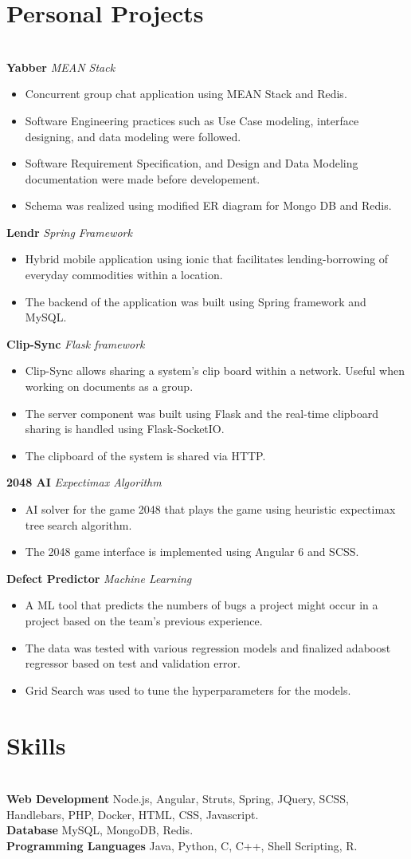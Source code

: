 \documentclass{resume}
\begin{document}
\section*{Personal Projects}
\titlerule
\noindent
\\
\textbf{Yabber} \hfill \textit{MEAN Stack}
\begin{itemize}
  \item Concurrent group chat application using MEAN Stack and Redis.
  \item Software Engineering practices such as Use Case modeling, interface designing, and data modeling were followed.
  \item Software Requirement Specification, and Design and Data Modeling documentation were made before developement.
  \item Schema was realized using modified ER diagram for Mongo DB and Redis.
\end{itemize}
\textbf{Lendr} \hfill \textit{Spring Framework}
\begin{itemize}
  \item Hybrid mobile application using ionic that facilitates lending-borrowing of everyday commodities within a location.
  \item The backend of the application was built using Spring framework and MySQL.
\end{itemize}
\textbf{Clip-Sync} \hfill \textit{Flask framework}
\begin{itemize}
  \item Clip-Sync allows sharing a system's clip board within a network. Useful when working on documents as a group.
  \item The server component was built using Flask and the real-time clipboard sharing is handled using Flask-SocketIO.
  \item The clipboard of the system is shared via HTTP.
\end{itemize}
\textbf{2048 AI} \hfill \textit{Expectimax Algorithm}
\begin{itemize}
  \item AI solver for the game 2048 that plays the game using heuristic expectimax tree search algorithm.
  \item The 2048 game interface is implemented using Angular 6 and SCSS.
\end{itemize}
\textbf{Defect Predictor} \hfill \textit{Machine Learning}
\begin{itemize}
  \item A ML tool that predicts the numbers of bugs a project might occur in a project based on the team's previous experience.
  \item The data was tested with various regression models and finalized adaboost regressor based on test and validation error.
  \item Grid Search was used to tune the hyperparameters for the models.
\end{itemize}
\section*{Skills}
\titlerule
\noindent
\\
\textbf{Web Development} Node.js, Angular, Struts, Spring, JQuery, SCSS, Handlebars, PHP, Docker, HTML, CSS, Javascript. \\
\textbf{Database} MySQL, MongoDB, Redis. \\
\textbf{Programming Languages} Java, Python, C, C++, Shell Scripting, R.\\
\end{document}
